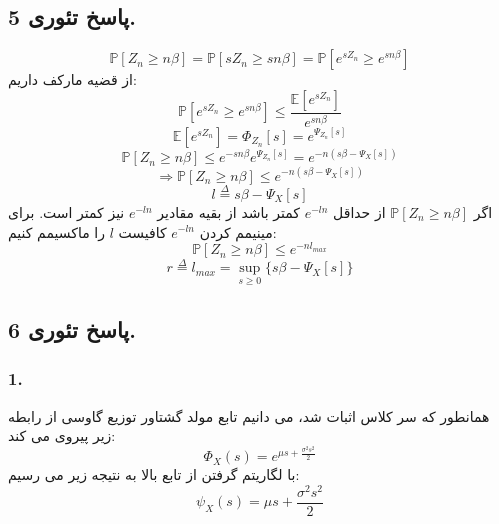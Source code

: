 \documentclass[]{article}
\begin{document}
	\subsection{پاسخ تئوری 5.}
	\begin{equation}
		\nonumber
		\mathbb{P}[Z_n \geqslant n\beta] = \mathbb{P}[sZ_n \geqslant sn\beta] = \mathbb{P}[e^{sZ_n} \geqslant e^{sn\beta}]
	\end{equation}
	از قضیه مارکف داریم:
	\begin{equation}
		\nonumber
		\mathbb{P}[e^{sZ_n} \geqslant e^{sn\beta}] \leqslant \frac{\mathbb{E}[e^{sZ_n}]}{e^{sn\beta}}
	\end{equation}
	\begin{equation}
		\nonumber
		\mathbb{E}[e^{sZ_n}] = \Phi_{Z_n}[s] = e^{\Psi_{Z_n}[s]}
	\end{equation}
	\begin{equation}
		\nonumber
		\mathbb{P}[Z_n \geqslant n\beta] \leqslant e^{-sn\beta}e^{\Psi_{Z_n}[s]} = e^{-n(s\beta - \Psi_{X}[s])}
	\end{equation}
	\begin{equation}
		\nonumber
		\Rightarrow \mathbb{P}[Z_n \geqslant n\beta] \leqslant e^{-n(s\beta - \Psi_{X}[s])}
	\end{equation}
	\begin{equation}
		\nonumber
		l \overset{\Delta}{=} s\beta - \Psi_{X}[s]
	\end{equation}
	اگر $\mathbb{P}[Z_n \geqslant n\beta]$ از حداقل $e^{-ln}$ کمتر باشد از بقیه مقادیر $e^{-ln}$ نیز کمتر است. برای مینیمم کردن $e^{-ln}$ کافیست $l$ را ماکسیمم کنیم:
	\begin{equation}
		\nonumber
		\mathbb{P}[Z_n \geqslant n\beta] \leqslant e^{-nl_{max}}
	\end{equation}
	\begin{equation}
		\nonumber
		r \overset{\Delta}{=} l_{max} = \sup_{s \geqslant 0}\{s\beta - \Psi_{X}[s]\}
	\end{equation}
	\newpage
	\subsection{پاسخ تئوری 6.}
	\subsubsection{1.}
	همانطور که سر کلاس اثبات شد، می دانیم تابع مولد گشتاور توزیع گاوسی از رابطه زیر پیروی می کند:
	\begin{equation}
		\nonumber
		\Phi_X(s) = e^{\mu s + \frac{\sigma^2 s^2}{2}}
	\end{equation}
	با لگاریتم گرفتن از تابع بالا به نتیجه زیر می رسیم:
	\begin{equation}
		\nonumber
		\psi_X(s) = \mu s + \frac{\sigma^2 s^2}{2}
	\end{equation}
\end{document}

